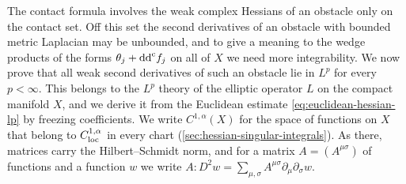The contact formula involves the weak complex Hessians of an obstacle only on the contact set. Off this set the second derivatives of an obstacle with bounded metric Laplacian may be unbounded, and to give a meaning to the wedge products of the forms $\theta_j+\mathrm{dd}^{\mathrm{c}} f_j$ on all of $X$ we need more integrability. We now prove that all weak second derivatives of such an obstacle lie in $L^p$ for every $p<\infty$. This belongs to the $L^p$ theory of the elliptic operator $L$ on the compact manifold $X$, and we derive it from the Euclidean estimate \eqref{eq:euclidean-hessian-lp} by freezing coefficients. We write $C^{1,\alpha}(X)$ for the space of functions on $X$ that belong to $C^{1,\alpha}_{\mathrm{loc}}$ in every chart (\cref{sec:hessian-singular-integrals}). As there, matrices carry the Hilbert--Schmidt norm, and for a matrix $A=(A^{\mu\sigma})$ of functions and a function $w$ we write $A:D^2w=\sum_{\mu,\sigma}A^{\mu\sigma}\partial_\mu\partial_\sigma w$.

